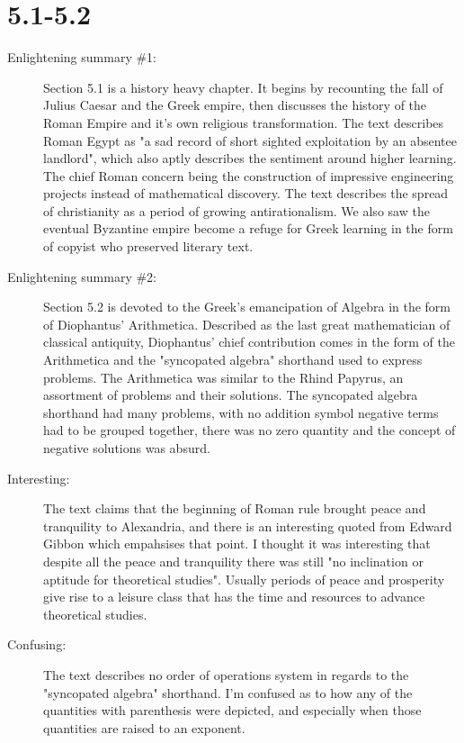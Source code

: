 \documentclass[12pt]{article}
\theoremstyle{homework}
\begin{document}
\section*{5.1-5.2}

\begin{description}
\item[Enlightening summary \#1:] Section 5.1 is a history heavy chapter. It begins by recounting the fall of Julius Caesar and the Greek empire, then discusses the
history of the Roman Empire and it's own religious transformation. The text describes Roman Egypt as "a sad record of short sighted exploitation by an absentee landlord",
which also aptly describes the sentiment around higher learning. The chief Roman concern being the construction of impressive engineering projects instead of mathematical discovery. 
The text describes the spread of christianity as a period of growing antirationalism. We also saw the eventual Byzantine empire become a refuge for Greek learning in the form of copyist who preserved literary text. 

   


\item[Enlightening summary \#2:] 
Section 5.2 is devoted to the Greek's emancipation of Algebra in the form of Diophantus' Arithmetica. Described as the last great 
mathematician of classical antiquity, Diophantus' chief contribution comes in the form of the Arithmetica and the "syncopated algebra" shorthand
used to express problems. The Arithmetica was similar to the Rhind Papyrus, an assortment of problems and their solutions. The 
syncopated algebra shorthand had many problems, with no addition symbol negative terms had to be grouped together, there was no zero quantity and the concept of 
negative solutions was absurd.  


\item[Interesting:]                                                                                        
 The text claims that the beginning of Roman rule brought peace and tranquility to Alexandria, and there is an interesting quoted from Edward Gibbon which empahsises that point. 
 I thought it was interesting that despite all the peace and tranquility there was still "no inclination or aptitude for theoretical studies". 
 Usually periods of peace and prosperity give rise to a leisure class that has the time and resources to advance theoretical studies. 

 
\item[Confusing:] The text describes no order of operations system in regards to the "syncopated algebra" shorthand. I'm confused
as to how any of the quantities with parenthesis were depicted, and especially when those quantities are raised to an exponent.   
 


 
\end{description}
\end{document}
